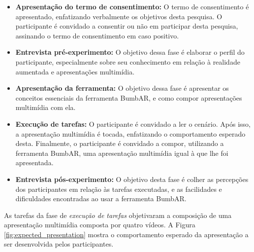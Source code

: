 \documentclass[../main.tex]{subfiles}
\begin{document}
\begin{itemize}
    \item \textbf{Apresentação do termo de consentimento:} O termo de consentimento é apresentado, enfatizando verbalmente os objetivos desta pesquisa. O participante é convidado a consentir ou não em participar desta pesquisa, assinando o termo de consentimento em caso positivo.
    \item \textbf{Entrevista pré-experimento:} O objetivo dessa fase é elaborar o perfil do participante, especialmente sobre seu conhecimento em relação à realidade aumentada e apresentações multimídia.
    \item \textbf{Apresentação da ferramenta:} O objetivo dessa fase é apresentar os conceitos essenciais da ferramenta BumbAR, e como compor apresentações multimídia com ela.
    \item \textbf{Execução de tarefas:} O participante é convidado a ler o cenário. Após isso, a apresentação multimídia é tocada, enfatizando o comportamento esperado desta. Finalmente, o participante é convidado a compor, utilizando a ferramenta BumbAR, uma apresentação multimídia igual à que lhe foi apresentada.
    \item \textbf{Entrevista pós-experimento:} O objetivo desta fase é colher as percepções dos participantes em relação às tarefas executadas, e as facilidades e dificuldades encontradas ao usar a ferramenta BumbAR.
\end{itemize}

As tarefas da fase de \emph{execução de tarefas} objetivaram a composição de uma apresentação multimídia composta por quatro vídeos. A Figura \ref{fig:expected_presentation} mostra o comportamento esperado da apresentação a ser desenvolvida pelos participantes.
\end{document}
